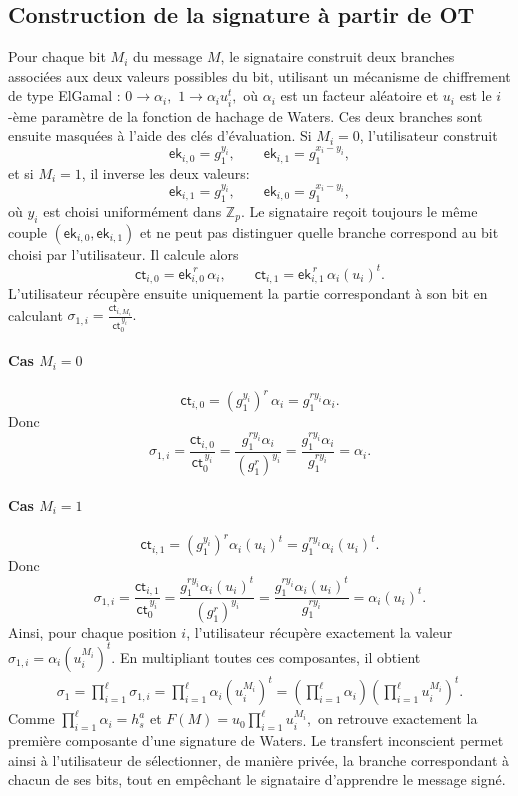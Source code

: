 \documentclass[10pt,a4paper]{article}
\theoremstyle{definition}
\theoremstyle{plain}
\theoremstyle{remark}
\begin{document}
\subsection{Construction de la signature à partir de OT}

Pour chaque bit $M_i$ du message $M$, le signataire construit deux branches
associées aux deux valeurs possibles du bit, utilisant un mécanisme de chiffrement de type ElGamal \cite{elgamal1985}:
$
0 \longrightarrow \alpha_i,
$
$
1 \longrightarrow \alpha_i u_i^t,
$
où $\alpha_i$ est un facteur aléatoire et $u_i$ est le $i$-ème paramètre de la
fonction de hachage de Waters.
Ces deux branches sont ensuite masquées à l'aide des clés d'évaluation. Si
$M_i=0$, l'utilisateur construit
\[
\mathsf{ek}_{i,0}=g_1^{y_i},
\qquad
\mathsf{ek}_{i,1}=g_1^{x_i-y_i},
\]
et si $M_i=1$, il inverse les deux valeurs:
\[
\mathsf{ek}_{i,1}=g_1^{y_i},
\qquad
\mathsf{ek}_{i,0}=g_1^{x_i-y_i},
\]
où $y_i$ est choisi uniformément dans $\mathbb Z_p$.
Le signataire reçoit toujours le même couple
$(\mathsf{ek}_{i,0},\mathsf{ek}_{i,1})$ et ne peut pas distinguer quelle
branche correspond au bit choisi par l'utilisateur. Il calcule alors
\[
\mathsf{ct}_{i,0}=\mathsf{ek}_{i,0}^{\,r}\,\alpha_i,
\qquad
\mathsf{ct}_{i,1}=\mathsf{ek}_{i,1}^{\,r}\,\alpha_i(u_i)^t.
\]
L'utilisateur récupère ensuite uniquement la partie correspondant à son
bit en calculant
$
\sigma_{1,i}
=
\frac{\mathsf{ct}_{i,M_i}}{\mathsf{ct}_0^{\,y_i}}.
$

\paragraph{Cas $M_i=0$}

\[
\mathsf{ct}_{i,0}
=
(g_1^{y_i})^r\,\alpha_i
=
g_1^{ry_i}\alpha_i.
\]
Donc
\[
\sigma_{1,i}
=
\frac{\mathsf{ct}_{i,0}}{\mathsf{ct}_0^{\,y_i}}
=
\frac{g_1^{ry_i}\alpha_i}{(g_1^r)^{y_i}}
=
\frac{g_1^{ry_i}\alpha_i}{g_1^{ry_i}}
=
\alpha_i.
\]

\paragraph{Cas $M_i=1$}

\[
\mathsf{ct}_{i,1}
=
(g_1^{y_i})^r\alpha_i(u_i)^t
=
g_1^{ry_i}\alpha_i(u_i)^t.
\]
Donc
\[
\sigma_{1,i}
=
\frac{\mathsf{ct}_{i,1}}{\mathsf{ct}_0^{\,y_i}}
=
\frac{g_1^{ry_i}\alpha_i(u_i)^t}{(g_1^r)^{y_i}}
=
\frac{g_1^{ry_i}\alpha_i(u_i)^t}{g_1^{ry_i}}
=
\alpha_i(u_i)^t.
\]
Ainsi, pour chaque position $i$, l'utilisateur récupère exactement la valeur
$
\sigma_{1,i}=\alpha_i(u_i^{M_i})^t.
$
En multipliant toutes ces composantes, il obtient
\[
\begin{aligned}
\sigma_1
=
\prod_{i=1}^{\ell}\sigma_{1,i} 
=
\prod_{i=1}^{\ell}\alpha_i(u_i^{M_i})^t 
=
\left(\prod_{i=1}^{\ell}\alpha_i\right)
\left(\prod_{i=1}^{\ell}u_i^{M_i}\right)^t.
\end{aligned}
\]
Comme $\prod_{i=1}^{\ell}\alpha_i=h_s^a$ et
$
F(M)=u_0\prod_{i=1}^{\ell}u_i^{M_i},
$
on retrouve exactement la première composante d'une signature de Waters. Le
transfert inconscient permet ainsi à l'utilisateur de sélectionner, de manière
privée, la branche correspondant à chacun de ses bits, tout en empêchant le
signataire d'apprendre le message signé.
\end{document}
